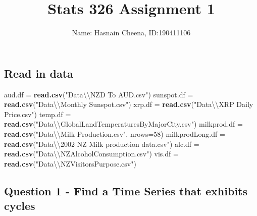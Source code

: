 \documentclass[
]{article}
\title{Stats 326 Assignment 1}
\author{Name: Hasnain Cheena, ID:190411106}
\date{}
\newenvironment{Shaded}{\begin{snugshade}}{\end{snugshade}}
\newcommand{\CharTok}[1]{\textcolor[rgb]{0.31,0.60,0.02}{#1}}
\newcommand{\DataTypeTok}[1]{\textcolor[rgb]{0.13,0.29,0.53}{#1}}
\newcommand{\DecValTok}[1]{\textcolor[rgb]{0.00,0.00,0.81}{#1}}
\newcommand{\KeywordTok}[1]{\textcolor[rgb]{0.13,0.29,0.53}{\textbf{#1}}}
\newcommand{\NormalTok}[1]{#1}
\newcommand{\StringTok}[1]{\textcolor[rgb]{0.31,0.60,0.02}{#1}}
\begin{document}
\maketitle

\hypertarget{read-in-data}{%
\subsection{Read in data}\label{read-in-data}}

\begin{Shaded}
\begin{Highlighting}[]
\NormalTok{aud.df =}\StringTok{ }\KeywordTok{read.csv}\NormalTok{(}\StringTok{"Data}\CharTok{\textbackslash{}\textbackslash{}}\StringTok{NZD To AUD.csv"}\NormalTok{)}
\NormalTok{sunspot.df =}\StringTok{ }\KeywordTok{read.csv}\NormalTok{(}\StringTok{"Data}\CharTok{\textbackslash{}\textbackslash{}}\StringTok{Monthly Sunspot.csv"}\NormalTok{)}
\NormalTok{xrp.df =}\StringTok{ }\KeywordTok{read.csv}\NormalTok{(}\StringTok{"Data}\CharTok{\textbackslash{}\textbackslash{}}\StringTok{XRP Daily Price.csv"}\NormalTok{)}
\NormalTok{temp.df =}\StringTok{ }\KeywordTok{read.csv}\NormalTok{(}\StringTok{"Data}\CharTok{\textbackslash{}\textbackslash{}}\StringTok{GlobalLandTemperaturesByMajorCity.csv"}\NormalTok{)}
\NormalTok{milkprod.df =}\StringTok{ }\KeywordTok{read.csv}\NormalTok{(}\StringTok{"Data}\CharTok{\textbackslash{}\textbackslash{}}\StringTok{Milk Production.csv"}\NormalTok{, }\DataTypeTok{nrows=}\DecValTok{58}\NormalTok{)}
\NormalTok{milkprodLong.df =}\StringTok{ }\KeywordTok{read.csv}\NormalTok{(}\StringTok{"Data}\CharTok{\textbackslash{}\textbackslash{}}\StringTok{2002 NZ Milk production data.csv"}\NormalTok{)}
\NormalTok{alc.df =}\StringTok{ }\KeywordTok{read.csv}\NormalTok{(}\StringTok{"Data}\CharTok{\textbackslash{}\textbackslash{}}\StringTok{NZAlcoholConsumption.csv"}\NormalTok{)}
\NormalTok{vis.df =}\StringTok{ }\KeywordTok{read.csv}\NormalTok{(}\StringTok{"Data}\CharTok{\textbackslash{}\textbackslash{}}\StringTok{NZVisitorsPurpose.csv"}\NormalTok{)}
\end{Highlighting}
\end{Shaded}

\hypertarget{question-1---find-a-time-series-that-exhibits-cycles}{%
\subsection{Question 1 - Find a Time Series that exhibits
cycles}\label{question-1---find-a-time-series-that-exhibits-cycles}}
\end{document}
